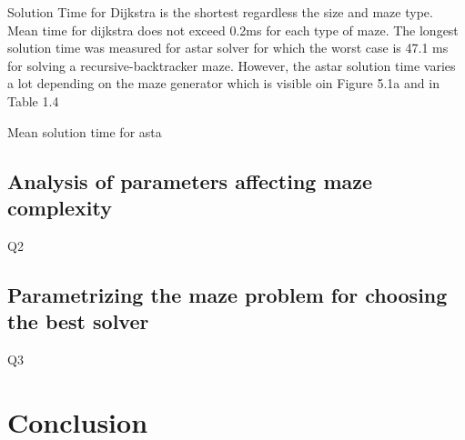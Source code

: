 Solution Time for Dijkstra is the shortest regardless the size and maze type. Mean time for dijkstra does not exceed 0.2ms for each type of maze.
The longest solution time was measured for astar solver for which the worst case is 47.1 ms for solving a recursive-backtracker maze.
However, the astar solution time varies a lot depending on the maze generator which is visible oin Figure 5.1a and in Table 1.4
 

Mean solution time for asta

 
\subsection{Analysis of parameters affecting maze complexity}Q2
\subsection{Parametrizing the maze problem for choosing the best solver}Q3
\section{Conclusion}
